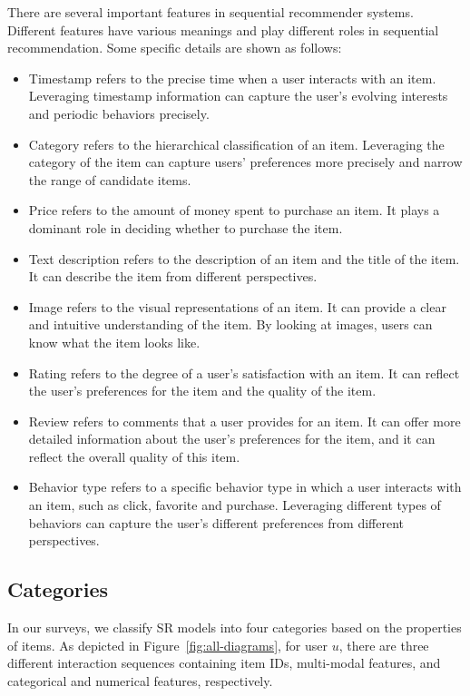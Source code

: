 \documentclass[review]{fcs}
\begin{document}
	There are several important features in sequential recommender systems. Different features have various meanings and play different roles in sequential recommendation. Some specific details are shown as follows:
	\begin{itemize}
		\item Timestamp refers to the precise time when a user interacts with an item. Leveraging timestamp information can capture the user’s evolving interests and periodic behaviors precisely.
		\item Category refers to the hierarchical classification of an item. Leveraging the category of the item can capture users’ preferences more precisely and narrow the range of candidate items.
		\item Price refers to the amount of money spent to purchase an item. It plays a dominant role in deciding whether to purchase the item.
		\item Text description refers to the description of an item and the title of the item. It can describe the item from different perspectives.
		\item Image refers to the visual representations of an item. It can provide a clear and intuitive understanding of the item. By looking at images, users can know what the item looks like.
		\item Rating refers to the degree of a user’s satisfaction with an item. It can reflect the user’s preferences for the item and the quality of the item.
		\item Review refers to comments that a user provides for an item. It can offer more detailed information about the user’s preferences for the item, and it can reflect the overall quality of this item.
		\item Behavior type refers to a specific behavior type in which a user interacts with an item, such as click, favorite and purchase. Leveraging different types of behaviors can capture the user's different preferences from different perspectives.
	\end{itemize}
	\subsection{Categories}
	In our surveys, we classify SR models into four categories based on the properties of items. As depicted in Figure~\ref{fig:all-diagrams}, for user $u$, there are three different interaction sequences containing item IDs, multi-modal features, and categorical and numerical features, respectively.
	
\end{document}
